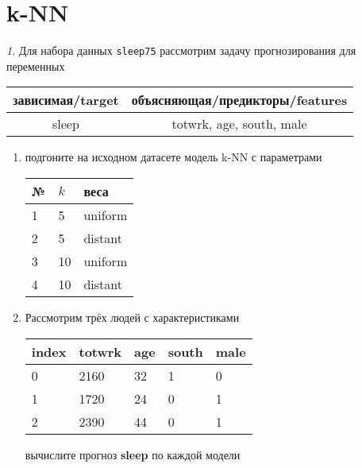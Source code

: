 \documentclass[12pt]{article}
\theoremstyle{remark}
\newtheorem{exercise}{}[section]
\begin{document}
\section{k-NN}

\begin{exercise}
Для набора данных \texttt{sleep75} рассмотрим задачу прогнозирования
для переменных
\begin{center}
	\begin{tabular}{|c|c|}\hline
		зависимая/target & объясняющая/предикторы/features \\ \hline
		sleep & totwrk, age, south, male \\ \hline
	\end{tabular}
\end{center}
\begin{enumerate}
	\item подгоните на исходном датасете модель k-NN с параметрами
	\begin{center}
		\begin{tabular}{|l|l|l|}\hline
		№ & \(k\) & веса \\ \hline
		1 & 5 & uniform \\
		2 & 5 & distant \\
		3 & 10 & uniform \\
		4 & 10 & distant \\ \hline
		\end{tabular}
	\end{center}
	\item Рассмотрим трёх людей с характеристиками
	\begin{center}
		\begin{tabular}{|l||l|l|l|l|}\hline
			index & totwrk & age & south & male \\ \hline\hline
			0 & 2160 & 32 & 1 & 0 \\
			1 & 1720 & 24 & 0 & 1 \\
			2 & 2390 & 44 & 0 & 1 \\ \hline
		\end{tabular}
	\end{center}
	вычислите прогноз \textbf{sleep} по каждой модели
\end{enumerate}
\end{exercise}
\end{document}
